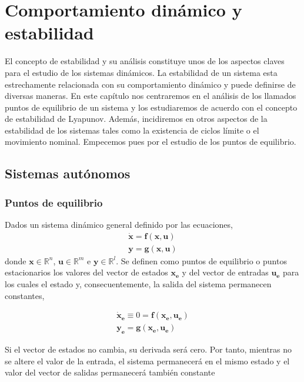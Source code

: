 \chapter{Comportamiento dinámico y estabilidad}
El concepto de estabilidad y su análisis constituye unos de los aspectos claves para el estudio de los sistemas dinámicos. La estabilidad de un sistema esta estrechamente relacionada con su comportamiento dinámico y puede definirse de diversas maneras. En este capítulo nos centraremos en el análisis de los llamados puntos de equilibrio de un sistema y los estudiaremos de acuerdo con el concepto de estabilidad de Lyapunov. Además, incidiremos en otros aspectos de la estabilidad de los sistemas tales como la existencia de ciclos límite o el movimiento nominal. Empecemos pues por el estudio de los puntos de equilibrio.

\section{Sistemas autónomos}

\subsection{Puntos de equilibrio} 
\begin{definition} Dados un sistema dinámico general definido por las ecuaciones,
\begin{align}
\mathbf{\dot{x}} = \mathbf{f}(\mathbf{x},\mathbf{u})\\
\mathbf{y} = \mathbf{g}(\mathbf{x},\mathbf{u})
\end{align}
donde $\mathbf{x} \in \mathbb{R}^n$, $\mathbf{u} \in \mathbb{R}^m$ e $\mathbf{y} \in \mathbb{R}^l$. Se definen como puntos de equilibrio o puntos estacionarios los valores del vector de estados $\mathbf{x_e}$ y del vector de entradas $\mathbf{u_e}$ para los cuales el estado y, consecuentemente, la salida del sistema permanecen constantes,

\begin{align}
\mathbf{\dot{x}_e} \equiv 0 = \mathbf{f}(\mathbf{x_e},\mathbf{u_e})\\
\mathbf{y_e} = \mathbf{g}(\mathbf{x_e},\mathbf{u_e})
\end{align}
\end{definition}

Si el vector de estados no cambia, su derivada será cero. Por tanto, mientras no se altere el valor de la entrada, el sistema permanecerá en el mismo estado y el valor del vector de salidas permanecerá también constante

